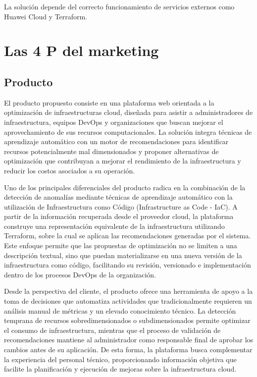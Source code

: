 La solución depende del correcto funcionamiento de servicios externos como Huawei Cloud y Terraform.

\section{Las 4 P del marketing}

\subsection{Producto}

El producto propuesto consiste en una plataforma web orientada a la optimización de infraestructuras cloud, diseñada para asistir a administradores de infraestructura, equipos DevOps y organizaciones que buscan mejorar el aprovechamiento de sus recursos computacionales. La solución integra técnicas de aprendizaje automático con un motor de recomendaciones para identificar recursos potencialmente mal dimensionados y proponer alternativas de optimización que contribuyan a mejorar el rendimiento de la infraestructura y reducir los costos asociados a su operación.

Uno de los principales diferenciales del producto radica en la combinación de la detección de anomalías mediante técnicas de aprendizaje automático con la utilización de Infraestructura como Código (Infrastructure as Code - IaC). A partir de la información recuperada desde el proveedor cloud, la plataforma construye una representación equivalente de la infraestructura utilizando Terraform, sobre la cual se aplican las recomendaciones generadas por el sistema. Este enfoque permite que las propuestas de optimización no se limiten a una descripción textual, sino que puedan materializarse en una nueva versión de la infraestructura como código, facilitando su revisión, versionado e implementación dentro de los procesos DevOps de la organización.

Desde la perspectiva del cliente, el producto ofrece una herramienta de apoyo a la toma de decisiones que automatiza actividades que tradicionalmente requieren un análisis manual de métricas y un elevado conocimiento técnico. La detección temprana de recursos sobredimensionados o subdimensionados permite optimizar el consumo de infraestructura, mientras que el proceso de validación de recomendaciones mantiene al administrador como responsable final de aprobar los cambios antes de su aplicación. De esta forma, la plataforma busca complementar la experiencia del personal técnico, proporcionando información objetiva que facilite la planificación y ejecución de mejoras sobre la infraestructura cloud.

